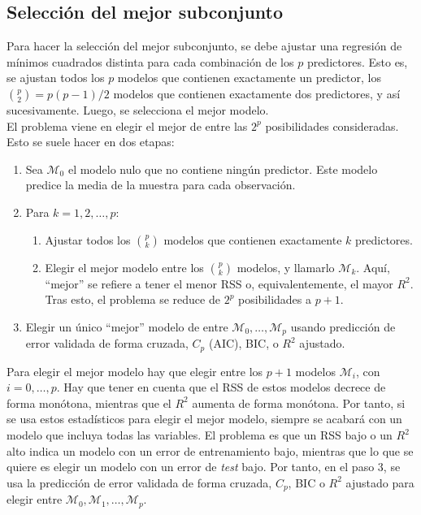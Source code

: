 \subsection{Selección del mejor subconjunto}

Para hacer la selección del mejor subconjunto, se debe ajustar una regresión de mínimos cuadrados distinta para cada combinación de los $p$ predictores. Esto es, se ajustan todos los $p$ modelos que contienen exactamente un predictor, los $\binom{p}{2} = p(p-1)/2$ modelos que contienen exactamente dos predictores, y así sucesivamente. Luego, se selecciona el mejor modelo. \\

El problema viene en elegir el mejor de entre las $2^p$ posibilidades consideradas. Esto se suele hacer en dos etapas:
\begin{enumerate}
\item Sea $\mathcal{M}_0$ el modelo nulo que no contiene ningún predictor. Este modelo predice la media de la muestra para cada observación.
\item Para $k = 1, 2, \ldots, p$:
\begin{enumerate}
\item Ajustar todos los $\binom{p}{k}$ modelos que contienen exactamente $k$ predictores.
\item Elegir el mejor modelo entre los $\binom{p}{k}$ modelos, y llamarlo $\mathcal{M}_k$. Aquí, ``mejor'' se refiere a tener el menor RSS o, equivalentemente, el mayor $R^2$. Tras esto, el problema se reduce de $2^p$ posibilidades a $p+1$. 
\end{enumerate}
\item Elegir un único ``mejor'' modelo de entre $\mathcal{M}_0, \dots, \mathcal{M}_p$ usando predicción de error validada de forma cruzada, $C_p$ (AIC), BIC, o $R^2$ ajustado.
\end{enumerate}

Para elegir el mejor modelo hay que elegir entre los $p+1$ modelos $\mathcal{M}_i$, con $i = 0, \dots, p$. Hay que tener en cuenta que el RSS de estos modelos decrece de forma monótona, mientras que el $R^2$ aumenta de forma monótona. Por tanto, si se usa estos estadísticos para elegir el mejor modelo, siempre se acabará con un modelo que incluya todas las variables. El problema es que un RSS bajo o un $R^2$ alto indica un modelo con un error de entrenamiento bajo, mientras que lo que se quiere es elegir un modelo con un error de \textit{test} bajo. Por tanto, en el paso 3, se usa la predicción de error validada de forma cruzada, $C_p$, BIC o $R^2$ ajustado para elegir entre $\mathcal{M}_0, \mathcal{M}_1, \dots, \mathcal{M}_p$. 

